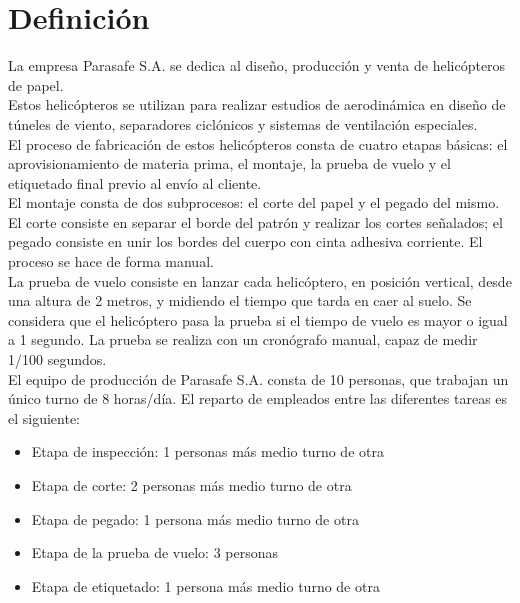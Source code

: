 \documentclass[12pt,a4paper,twoside,openright,titlepage,final]{article}
\author{José Ignacio Escribano}
\title{}
\begin{document}
\setcounter{page}{1}


\listoffigures
\thispagestyle{empty}
\newpage

\listoftables
\thispagestyle{empty}
\newpage

\tableofcontents
\thispagestyle{empty}
\newpage


\setcounter{page}{1}

\section{Definición}

La empresa Parasafe S.A. se dedica al diseño, producción y venta de helicópteros de papel.\\

Estos helicópteros se utilizan para realizar estudios de aerodinámica en diseño de túneles de viento, separadores ciclónicos y sistemas de ventilación especiales.\\

El proceso de fabricación de estos helicópteros consta de cuatro etapas básicas: el aprovisionamiento de materia prima, el montaje, la prueba de vuelo y el etiquetado final previo al envío al cliente.\\

El montaje consta de dos subprocesos: el corte del papel y el pegado del mismo. El corte consiste en separar el borde del patrón y realizar los cortes señalados; el pegado consiste en unir los bordes del cuerpo con cinta adhesiva corriente. El proceso se hace de forma manual.\\

La prueba de vuelo consiste en lanzar cada helicóptero, en posición vertical, desde una altura de 2 metros, y midiendo el tiempo que tarda en caer al suelo. Se considera que el helicóptero pasa la prueba si el tiempo de vuelo es mayor o igual a 1 segundo. La prueba se realiza con un cronógrafo manual, capaz de medir 1/100 segundos.\\

El equipo de producción de Parasafe S.A. consta de 10 personas, que trabajan un único turno de 8 horas/día. El reparto de empleados entre las diferentes tareas es el siguiente:

\begin{itemize}
	\item Etapa de inspección: 1 personas más medio turno de otra
	\item Etapa de corte: 2 personas más medio turno de otra
	\item Etapa de pegado: 1 persona más medio turno de otra
	\item Etapa de la prueba de vuelo: 3 personas
	\item Etapa de etiquetado: 1 persona más medio turno de otra
\end{itemize}
\end{document}
